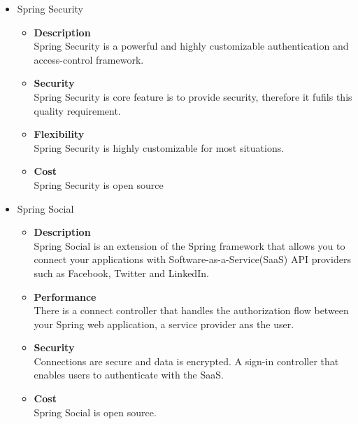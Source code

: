\documentclass[a4paper,10pt]{article}
\begin{document}
\begin{itemize}
		\item Spring Security
			\begin{itemize}
				\item \textbf{Description}\\
					Spring Security is a powerful and highly customizable authentication and access-control framework. 
				\item \textbf{Security}\\
					Spring Security is core feature is to provide security, therefore it fufils this quality requirement.
				\item \textbf{Flexibility}\\
					Spring Security is highly customizable for most situations.
				\item \textbf{Cost}\\
					Spring Security is open source
			\end{itemize}
			
		\item Spring Social
			\begin{itemize}
				\item \textbf{Description}\\
					Spring Social is an extension of the Spring framework that allows you to connect your applications with Software-as-a-Service(SaaS) API providers such as Facebook, Twitter and LinkedIn.
				\item \textbf{Performance}\\
					There is a connect controller that handles the authorization flow between your Spring web application, a service provider ans the user.
				\item \textbf{Security}\\
					Connections are secure and data is encrypted. A sign-in controller that enables users to authenticate with the SaaS.
				\item \textbf{Cost}\\
					Spring Social is open source.
			\end{itemize}
			

\end{itemize}
\end{document}
